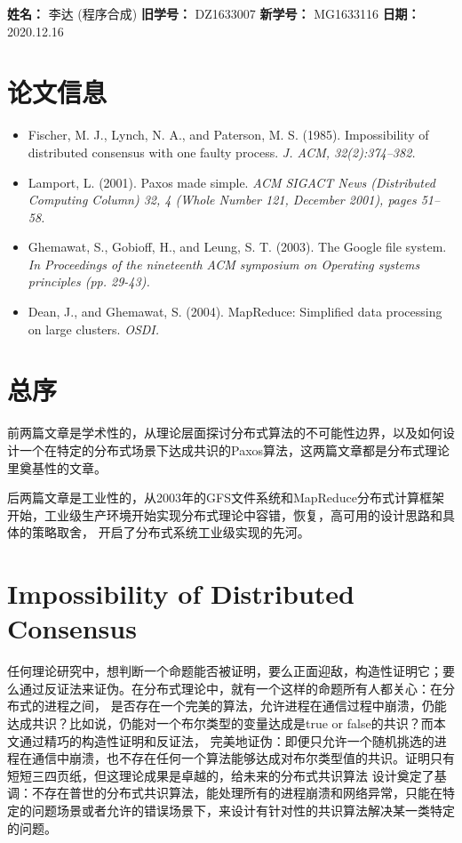 \documentclass[UTF8]{article}
\begin{document}
    
{\flushleft \bf \Large 姓名：} 李达 (程序合成)
{\flushleft \bf \Large 旧学号：} DZ1633007
{\flushleft \bf \Large 新学号：} MG1633116
{\flushleft \bf \Large 日期：} 2020.12.16

\section*{论文信息}
\begin{itemize}
    \item Fischer, M. J., Lynch, N. A., and Paterson, M. S. (1985). 
        Impossibility of distributed consensus with one faulty process. \textit{J. ACM, 32(2):374–382.}
    \item Lamport, L. (2001). Paxos made simple. 
    \textit{ACM SIGACT News (Distributed Computing Column) 32, 4 (Whole Number 121, December 2001), pages 51–58.}
    \item Ghemawat, S., Gobioff, H., and Leung, S. T. (2003). The Google file system. 
    \textit{In Proceedings of the nineteenth ACM symposium on Operating systems principles (pp. 29-43).}
    \item Dean, J., and Ghemawat, S. (2004). MapReduce: Simplified data processing on large clusters. \textit{OSDI.}
\end{itemize}
    
\section{总序}
前两篇文章是学术性的，从理论层面探讨分布式算法的不可能性边界，以及如何设计一个在特定的分布式场景下达成共识的Paxos算法，这两篇文章都是分布式理论里奠基性的文章。

后两篇文章是工业性的，从2003年的GFS文件系统和MapReduce分布式计算框架开始，工业级生产环境开始实现分布式理论中容错，恢复，高可用的设计思路和具体的策略取舍，
开启了分布式系统工业级实现的先河。

\section{Impossibility of Distributed Consensus}
任何理论研究中，想判断一个命题能否被证明，要么正面迎敌，构造性证明它；要么通过反证法来证伪。在分布式理论中，就有一个这样的命题所有人都关心：在分布式的进程之间，
是否存在一个完美的算法，允许进程在通信过程中崩溃，仍能达成共识？比如说，仍能对一个布尔类型的变量达成是true or false的共识？而本文通过精巧的构造性证明和反证法，
完美地证伪：即便只允许一个随机挑选的进程在通信中崩溃，也不存在任何一个算法能够达成对布尔类型值的共识。证明只有短短三四页纸，但这理论成果是卓越的，给未来的分布式共识算法
设计奠定了基调：不存在普世的分布式共识算法，能处理所有的进程崩溃和网络异常，只能在特定的问题场景或者允许的错误场景下，来设计有针对性的共识算法解决某一类特定的问题。
\end{document}

